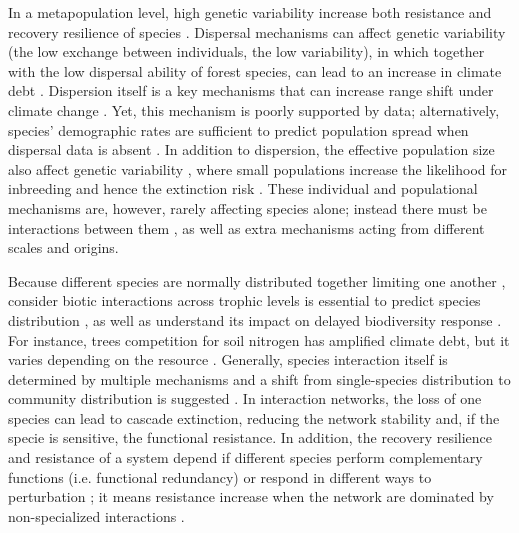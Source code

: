 In a metapopulation level, high genetic variability increase both resistance and recovery resilience of species \parencite{Hylander2013,Oliver2015}.
Dispersal mechanisms can affect genetic variability (the low exchange between individuals, the low variability), in which together with the low dispersal ability of forest species, can lead to an increase in climate debt \parencite{Hylander2013,Bertrand2016}.
Dispersion itself is a key mechanisms that can increase range shift under climate change \parencite{Gonzalez-Varo2017}. Yet, this mechanism is poorly supported by data; alternatively, species’ demographic rates are sufficient to predict population spread when dispersal data is absent \parencite{Hemrova2017}.
In addition to dispersion, the effective population size also affect genetic variability \parencite{Oliver2015}, where small populations increase the likelihood for inbreeding and hence the extinction risk \parencite{Nieminen2001}.
These individual and populational mechanisms are, however, rarely affecting species alone; instead there must be interactions between them \parencite{Hylander2013}, as well as extra mechanisms acting from different scales and origins.

Because different species are normally distributed together limiting one another \parencite{Clark2014a}, consider biotic interactions across trophic levels is essential to predict species distribution \parencite{VanderPutten2010}, as well as understand its impact on delayed biodiversity response \parencite{Essl2015}.
For instance, trees competition for soil nitrogen has amplified climate debt, but it varies depending on the resource \parencite{Bertrand2016}.
Generally, species interaction itself is determined by multiple mechanisms \parencite[for an overview]{Louthan2015} and a shift from single-species distribution to community distribution is suggested \parencite{Cazelles2016}.
In interaction networks, the loss of one species can lead to cascade extinction, reducing the network stability \parencite{Dunne2002} and, if the specie is sensitive, the functional resistance.
In addition, the recovery resilience and resistance of a system depend if different species perform complementary functions (i.e. functional redundancy) or respond in different ways to perturbation \parencite{Winfree2009}; it means resistance increase when the network are dominated by non-specialized interactions \parencite{Oliver2015}.\\

